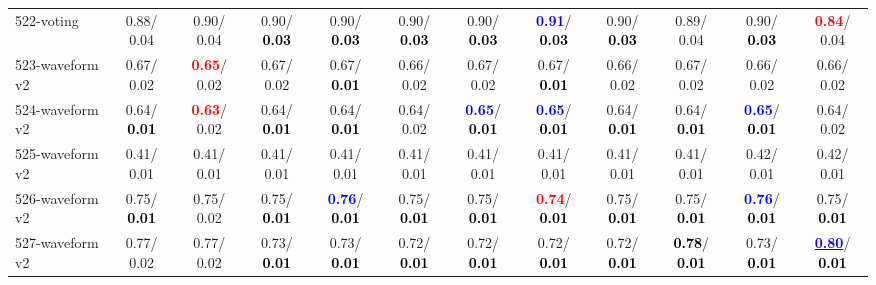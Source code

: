 \begin{table}[h]
\begin{center}
{\begin{tabular}{lc|c|c|c|c|c|c|c|c|c|c}
522-voting &   0.88/  0.04 &   0.90/  0.04 &   0.90/\textcolor{black}{\textbf{  0.03}} &   0.90/\textcolor{black}{\textbf{  0.03}} &   0.90/\textcolor{black}{\textbf{  0.03}} &   0.90/\textcolor{black}{\textbf{  0.03}} & \textcolor{blue}{\textbf{  0.91}}/\textcolor{black}{\textbf{  0.03}} &   0.90/\textcolor{black}{\textbf{  0.03}} &   0.89/  0.04 &   0.90/\textcolor{black}{\textbf{  0.03}} & \textcolor{red}{\textbf{  0.84}}/  0.04 \\
523-waveform v2 &   0.67/  0.02 & \textcolor{red}{\textbf{  0.65}}/  0.02 &   0.67/  0.02 &   0.67/\textcolor{black}{\textbf{  0.01}} &   0.66/  0.02 &   0.67/  0.02 &   0.67/\textcolor{black}{\textbf{  0.01}} &   0.66/  0.02 &   0.67/  0.02 &   0.66/  0.02 &   0.66/  0.02 \\
524-waveform v2 &   0.64/\textcolor{black}{\textbf{  0.01}} & \textcolor{red}{\textbf{  0.63}}/  0.02 &   0.64/\textcolor{black}{\textbf{  0.01}} &   0.64/\textcolor{black}{\textbf{  0.01}} &   0.64/  0.02 & \textcolor{blue}{\textbf{  0.65}}/\textcolor{black}{\textbf{  0.01}} & \textcolor{blue}{\textbf{  0.65}}/\textcolor{black}{\textbf{  0.01}} &   0.64/\textcolor{black}{\textbf{  0.01}} &   0.64/\textcolor{black}{\textbf{  0.01}} & \textcolor{blue}{\textbf{  0.65}}/\textcolor{black}{\textbf{  0.01}} &   0.64/  0.02 \\
525-waveform v2 &   0.41/  0.01 &   0.41/  0.01 &   0.41/  0.01 &   0.41/  0.01 &   0.41/  0.01 &   0.41/  0.01 &   0.41/  0.01 &   0.41/  0.01 &   0.41/  0.01 &   0.42/  0.01 &   0.42/  0.01 \\
526-waveform v2 &   0.75/\textcolor{black}{\textbf{  0.01}} &   0.75/  0.02 &   0.75/\textcolor{black}{\textbf{  0.01}} & \textcolor{blue}{\textbf{  0.76}}/\textcolor{black}{\textbf{  0.01}} &   0.75/\textcolor{black}{\textbf{  0.01}} &   0.75/\textcolor{black}{\textbf{  0.01}} & \textcolor{red}{\textbf{  0.74}}/\textcolor{black}{\textbf{  0.01}} &   0.75/\textcolor{black}{\textbf{  0.01}} &   0.75/\textcolor{black}{\textbf{  0.01}} & \textcolor{blue}{\textbf{  0.76}}/\textcolor{black}{\textbf{  0.01}} &   0.75/\textcolor{black}{\textbf{  0.01}} \\ \hline
527-waveform v2 &   0.77/  0.02 &   0.77/  0.02 &   0.73/\textcolor{black}{\textbf{  0.01}} &   0.73/\textcolor{black}{\textbf{  0.01}} &   0.72/\textcolor{black}{\textbf{  0.01}} &   0.72/\textcolor{black}{\textbf{  0.01}} &   0.72/\textcolor{black}{\textbf{  0.01}} &   0.72/\textcolor{black}{\textbf{  0.01}} & \textcolor{black}{\textbf{  0.78}}/\textcolor{black}{\textbf{  0.01}} &   0.73/\textcolor{black}{\textbf{  0.01}} & \underline{\textcolor{blue}{\textbf{  0.80}}}/\textcolor{black}{\textbf{  0.01}} \\

\end{tabular}}
\end{center}
\end{table}
